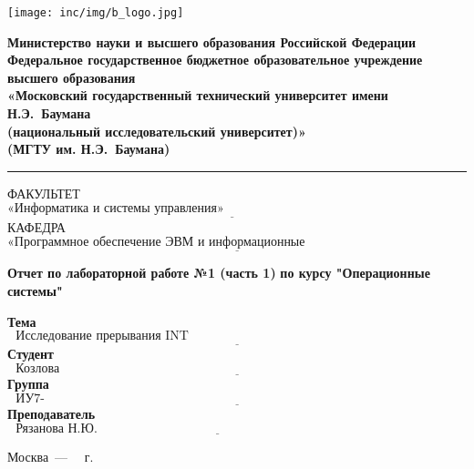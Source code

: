 \begin{titlepage}
	\fontsize{12pt}{12pt}\selectfont
	\noindent \begin{minipage}{0.15\textwidth}
		\texttt{[image: inc/img/b\_logo.jpg]}
	\end{minipage}
	\noindent\begin{minipage}{0.9\textwidth}\centering
		\textbf{Министерство науки и высшего образования Российской Федерации}\\
		\textbf{Федеральное государственное бюджетное образовательное учреждение высшего образования}\\
		\textbf{«Московский государственный технический университет имени Н.Э.~Баумана}\\
		\textbf{(национальный исследовательский университет)»}\\
		\textbf{(МГТУ им. Н.Э.~Баумана)}
	\end{minipage}
	
	\noindent\rule{18cm}{3pt}
	\newline\newline
	\noindent ФАКУЛЬТЕТ $\underline{\text{«Информатика и системы управления»~~~~~~~~~~~~~~~~~~~~~~~~~~~~~~~~~~~~~~~~~~~~~~~~~~~~~~~}}$ \newline\newline
	\noindent КАФЕДРА $\underline{\text{«Программное обеспечение ЭВМ и информационные технологии»~~~~~~~~~~~~~~~~~~~~~~~}}$\newline\newline\newline\newline\newline\newline\newline
	
	
	\begin{center}
		\Large\textbf{Отчет по лабораторной работе №1 (часть 1)}\newline
		\Large\textbf {по курсу "Операционные системы"}\newline
	\end{center}
	
	\noindent\textbf{Тема} $\underline{\text{~~Исследование прерывания INT 8h~~~~~~~~~~~~~~~~~~~~~~~~~~~~~~~~~~~~~~~~~~~~~~~~~~~~~~~~~~~~~~~~~~~~}}$\newline\newline\newline
	\noindent\textbf{Студент} $\underline{\text{~~Козлова И.В.~~~~~~~~~~~~~~~~~~~~~~~~~~~~~~~~~~~~~~~~~~~~~~~~~~~~~~~~~~~~~~~~~~~~~~~~~~~~~~~~~~~~~~~~~~~}}$\newline\newline
	\noindent\textbf{Группа} $\underline{\text{~~ИУ7-52Б~~~~~~~~~~~~~~~~~~~~~~~~~~~~~~~~~~~~~~~~~~~~~~~~~~~~~~~~~~~~~~~~~~~~~~~~~~~~~~~~~~~~~~~~~~~~~~~~~~~}}$\newline\newline
	\noindent\textbf{Преподаватель} $\underline{\text{~~Рязанова Н.Ю.~~~~~~~~~~~~~~~~~~~~~~~~~~~~~~~~~~~~~~~~~~~~~~~~~~~~~~~~~~~~~~~~~~~~~~~~~~~~~~}}$\newline
	
	\begin{center}
		\vfill
		Москва~---~\the\year
		~г.
	\end{center}
	\restoregeometry
\end{titlepage}